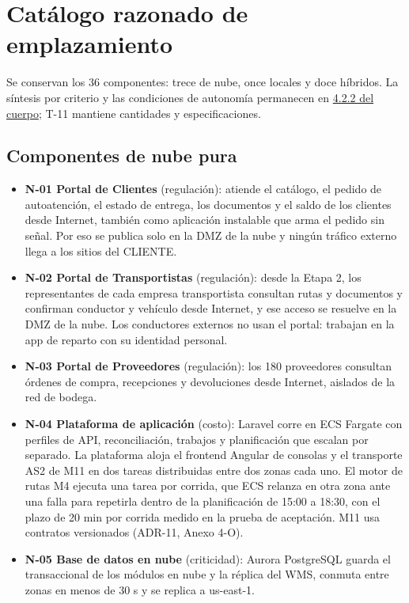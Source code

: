 \section{Catálogo razonado de emplazamiento}
\label{anx:X-emplazamiento}
Se conservan los 36 componentes: trece de nube, once locales y doce híbridos. La síntesis por criterio y las condiciones de autonomía permanecen en \href{LAFROX-Subdocumento4.pdf#fuente-02-a-emplazamiento}{4.2.2 del cuerpo}; T-11 mantiene cantidades y especificaciones.

\subsection*{Componentes de nube pura}
\label{anx:X-nube}
\begin{itemize}
  \item \textbf{N-01 Portal de Clientes} (regulación): atiende el catálogo, el pedido de autoatención, el estado de entrega, los documentos y el saldo de los clientes desde Internet, también como aplicación instalable que arma el pedido sin señal. Por eso se publica solo en la DMZ de la nube y ningún tráfico externo llega a los sitios del CLIENTE.
  \item \textbf{N-02 Portal de Transportistas} (regulación): desde la Etapa 2, los representantes de cada empresa transportista consultan rutas y documentos y confirman conductor y vehículo desde Internet, y ese acceso se resuelve en la DMZ de la nube. Los conductores externos no usan el portal: trabajan en la app de reparto con su identidad personal.
  \item \textbf{N-03 Portal de Proveedores} (regulación): los 180 proveedores consultan órdenes de compra, recepciones y devoluciones desde Internet, aislados de la red de bodega.
  \item \textbf{N-04 Plataforma de aplicación} (costo): Laravel corre en ECS Fargate con perfiles de API, reconciliación, trabajos y planificación que escalan por separado. La plataforma aloja el frontend Angular de consolas y el transporte AS2 de M11 en dos tareas distribuidas entre dos zonas cada uno. El motor de rutas M4 ejecuta una tarea por corrida, que ECS relanza en otra zona ante una falla para repetirla dentro de la planificación de 15:00 a 18:30, con el plazo de 20 min por corrida medido en la prueba de aceptación. M11 usa contratos versionados (ADR-11, Anexo 4-O).
  \item \textbf{N-05 Base de datos en nube} (criticidad): Aurora PostgreSQL guarda el transaccional de los módulos en nube y la réplica del WMS, conmuta entre zonas en menos de 30 s y se replica a us-east-1.

\end{itemize}
